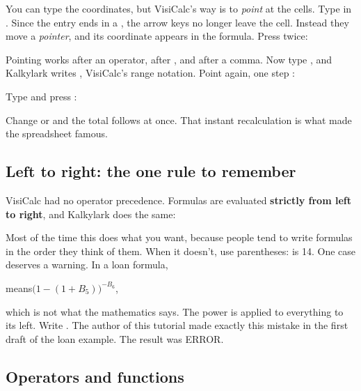 \documentclass[11pt]{article}
\begin{document}
You can type the coordinates, but VisiCalc's way is to \emph{point} at the
cells. Type  in . Since the entry ends in a \typ{(},
the arrow keys no longer leave the cell. Instead they move a
\emph{pointer}, and its coordinate appears in the formula. Press \up{}
twice:


Pointing works after an operator, after \typ{(}, and after a comma. Now type
, and Kalkylark writes , VisiCalc's range notation. Point
again, one step \down:


Type \typ{)} and press \enter:


Change  or  and the total follows at once. That instant
recalculation is what made the spreadsheet famous.

\subsection{Left to right: the one rule to remember}

VisiCalc had no operator precedence. Formulas are evaluated \textbf{strictly
from left to right}, and Kalkylark does the same:


Most of the time this does what you want, because people tend to write
formulas in the order they think of them. When it doesn't, use parentheses:
 is 14. One case deserves a warning. In a loan formula,

\begin{center}
\quad means\quad $\bigl(1-(1+B_5)\bigr)^{-B_6}$,
\end{center}

which is not what the mathematics says. The power is applied to everything
to its left. Write . The author of this tutorial
made exactly this mistake in the first draft of the loan example. The result
was \textsf{ERROR}.

\subsection{Operators and functions}
\end{document}

